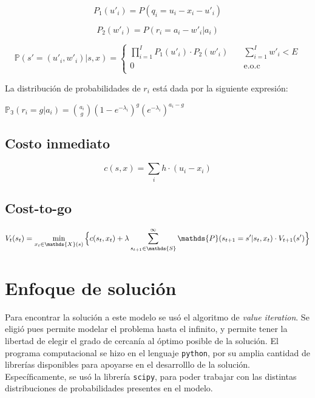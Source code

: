 \documentclass[letterpaper,10pt]{article}
\begin{document}
    $$P_1(u'_{i}) = P(q_{i} = u_{i} - x_{i} - u'_{i})$$
    
    $$P_2(w'_{i}) = P(r_{i} = a_{i} - w'_{i} | a_i)$$
    
    \[
    \mathds{P}(s'= (u'_{i}, w'_{i})| s, x) = 
        \begin{cases}
             
             
             \prod\limits_{i=1}^{I}P_1(u'_{i}) \cdot P_2(w'_{i})& \quad  \sum\limits_{i=1}^{I}w'_{i} < E\text{}\\
           0 & \quad\text{e.o.c }  \\
         \end{cases}
    \]
    
    
    La distribución de probabilidades de $r_i$ está dada por la siguiente expresión:
    
    $\mathds{P_3}(r_i = g | a_i) = {a_i\choose g}(1-e^{-\lambda_i})^g(e^{-\lambda_i})^{a_i-g}$
    

    
\subsection*{Costo inmediato}

    $$ c(s, x) = \sum\limits_{i} h \cdot (u_{i} - x_{i})$$

    
\subsection*{Cost-to-go}

    $$ V_t(s_t) = \min_{x_t \in \mathds{X}(s)} \Big{\{}c(s_t, x_t) + \lambda \sum \limits_{s_{t+1} \in \mathds{S}}^{\infty}\mathds{P}(s_{t+1}=s' |s_t, x_t) \cdot V_{t+1}(s')\Big{\}} $$



\section*{Enfoque de solución}

Para encontrar la solución a este modelo se usó el algoritmo de \textit{value iteration}. Se eligió pues permite modelar el problema hasta el infinito, y permite tener la libertad de elegir el grado de cercanía al óptimo posible de la solución. El programa computacional se hizo en el lenguaje \texttt{python}, por su amplia cantidad de librerías disponibles para apoyarse en el desarrolllo de la solución. Específicamente, se usó la librería \texttt{scipy}, para poder trabajar con las distintas distribuciones de probabilidades presentes en el modelo. 
\end{document}
